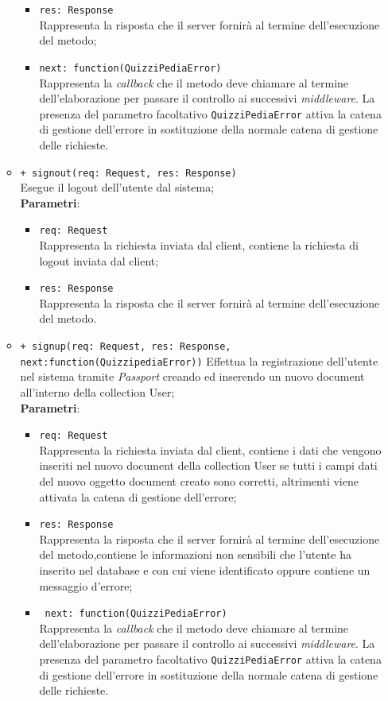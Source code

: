 \begin{itemize}
\begin{itemize}
\begin{itemize}
		  \item
			\texttt{res: Response} \\
			Rappresenta la risposta che il server fornirà al termine dell'esecuzione del metodo;
		  \item
		    \texttt{next: function(QuizziPediaError)} \\
			Rappresenta la \textit{callback} che il metodo deve chiamare al termine dell'elaborazione per passare il controllo ai successivi \textit{middleware}. La presenza del parametro facoltativo \texttt{QuizziPediaError} attiva la catena di gestione dell'errore in sostituzione della normale catena di gestione delle richieste.
		 \end{itemize}
		\item
		\texttt{+ signout(req: Request, res: Response)} \\
		Esegue il logout dell’utente dal sistema;\\
		\textbf{Parametri}:
		 \begin{itemize}
		 \item
			\texttt{req: Request} \\
			Rappresenta la richiesta inviata dal client, contiene la richiesta di logout inviata dal client;
		 \item
			\texttt{res: Response} \\
			Rappresenta la risposta che il server fornirà al termine dell'esecuzione del metodo. 
		 \end{itemize} 
		\item
		\texttt{+ signup(req: Request, res: Response, next:function(QuizzipediaError))}
		Effettua la registrazione dell’utente nel sistema tramite \textit{Passport} creando ed inserendo un nuovo document all’interno della collection User;\\
		\textbf{Parametri}:
		 \begin{itemize}
		 \item
			\texttt{req: Request} \\
			Rappresenta la richiesta inviata dal client, contiene i dati che vengono inseriti nel nuovo document della collection User se tutti i campi dati del nuovo oggetto document creato sono corretti, altrimenti viene attivata la catena di gestione dell'errore;
		 \item
			\texttt{res: Response} \\
			Rappresenta la risposta che il server fornirà al termine dell'esecuzione del metodo,contiene le informazioni non sensibili che l'utente ha inserito nel database e con cui viene identificato oppure contiene un messaggio d'errore;
		  \item
			\texttt{ next: function(QuizziPediaError)} \\
			Rappresenta la \textit{callback} che il metodo deve chiamare al termine dell'elaborazione per passare il controllo ai successivi \textit{middleware}. La presenza del parametro facoltativo \texttt{QuizziPediaError} attiva la catena di gestione dell'errore in sostituzione della normale catena di gestione delle richieste.		 	
		 \end{itemize} 	 		
	\end{itemize}	
\end{itemize}	
